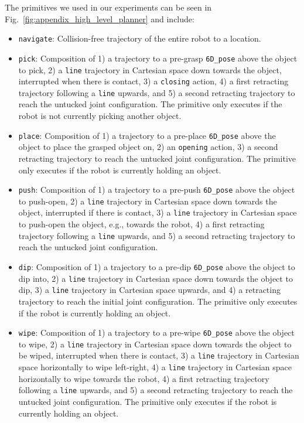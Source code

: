 The primitives we used in our experiments can be seen in Fig.~\ref{fig:appendix_high_level_planner} and include:
\vspace{-2mm}
\begin{itemize}[leftmargin=2em]
\item[a)] \texttt{navigate}: Collision-free trajectory of the entire robot to a location.
\item[b)] \texttt{pick}: Composition of 1) a trajectory to a pre-grasp \texttt{6D\_pose} above the object to pick, 2) a \texttt{line} trajectory in Cartesian space down towards the object, interrupted when there is contact, 3) a \texttt{closing} action, 4) a first retracting trajectory following a \texttt{line} upwards, and 5) a second retracting trajectory to reach the untucked joint configuration. The primitive only executes if the robot is not currently picking another object.
\item[c)] \texttt{place}: Composition of 1) a trajectory to a pre-place \texttt{6D\_pose} above the object to place the grasped object on, 2) an \texttt{opening} action, 3) a second retracting trajectory to reach the untucked joint configuration. The primitive only executes if the robot is currently holding an object.
\item[d)] \texttt{push}: Composition of 1) a trajectory to a pre-push \texttt{6D\_pose} above the object to push-open, 2) a \texttt{line} trajectory in Cartesian space down towards the object, interrupted if there is contact, 3) a \texttt{line} trajectory in Cartesian space to push-open the object, e.g., towards the robot, 4) a first retracting trajectory following a \texttt{line} upwards, and 5) a second retracting trajectory to reach the untucked joint configuration. 
\item[e)] \texttt{dip}: Composition of 1) a trajectory to a pre-dip \texttt{6D\_pose} above the object to dip into, 2) a \texttt{line} trajectory in Cartesian space down towards the object to dip, 3) a \texttt{line} trajectory in Cartesian space upwards, and 4) a retracting trajectory to reach the initial joint configuration. The primitive only executes if the robot is currently holding an object.
\item[f)] \texttt{wipe}: Composition of 1) a trajectory to a pre-wipe \texttt{6D\_pose} above the object to wipe, 2) a \texttt{line} trajectory in Cartesian space down towards the object to be wiped, interrupted when there is contact, 3) a \texttt{line} trajectory in Cartesian space horizontally to wipe left-right, 4) a \texttt{line} trajectory in Cartesian space horizontally to wipe towards the robot, 4) a first retracting trajectory following a \texttt{line} upwards, and 5) a second retracting trajectory to reach the untucked joint configuration. The primitive only executes if the robot is currently holding an object.
\end{itemize}

